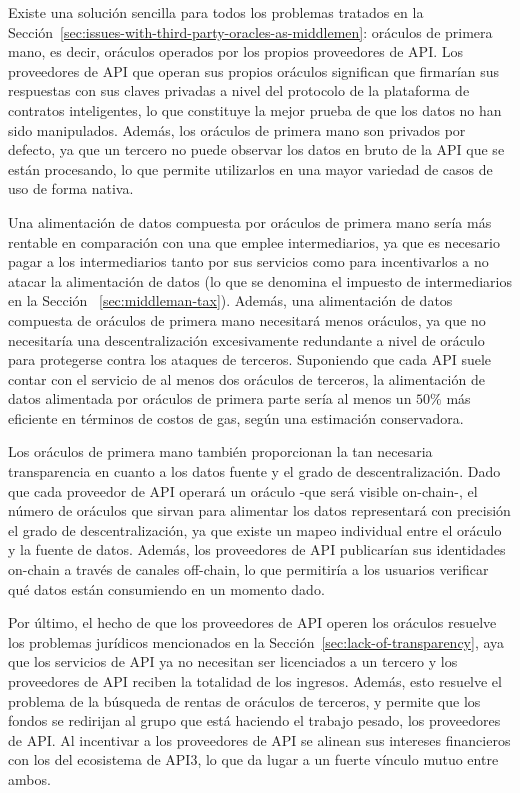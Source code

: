 \documentclass[11pt]{article}
\begin{document}
Existe una solución sencilla para todos los problemas tratados en la Sección~\ref{sec:issues-with-third-party-oracles-as-middlemen}: oráculos de primera mano, es decir, oráculos operados por los propios proveedores de API. Los proveedores de API que operan sus propios oráculos significan que firmarían sus respuestas con sus claves privadas a nivel del protocolo de la plataforma de contratos inteligentes, lo que constituye la mejor prueba de que los datos no han sido manipulados. Además, los oráculos de primera mano son privados por defecto, ya que un tercero no puede observar los datos en bruto de la API que se están procesando, lo que permite utilizarlos en una mayor variedad de casos de uso de forma nativa. 

Una alimentación de datos compuesta por oráculos de primera mano sería más rentable en comparación con una que emplee intermediarios, ya que es necesario pagar a los intermediarios tanto por sus servicios como para incentivarlos a no atacar la alimentación de datos (lo que se denomina el impuesto de intermediarios en la Sección ~\ref{sec:middleman-tax}).
Además, una alimentación de datos compuesta de oráculos de primera mano necesitará menos oráculos, ya que no necesitaría una descentralización excesivamente redundante a nivel de oráculo para protegerse contra los ataques de terceros. Suponiendo que cada API suele contar con el servicio de al menos dos oráculos de terceros, la alimentación de datos alimentada por oráculos de primera parte sería al menos un $50\%$ más eficiente en términos de costos de gas, según una estimación conservadora.


Los oráculos de primera mano también proporcionan la tan necesaria transparencia en cuanto a los datos fuente y el grado de descentralización. Dado que cada proveedor de API operará un oráculo -que será visible on-chain-, el número de oráculos que sirvan para alimentar los datos representará con precisión el grado de descentralización, ya que existe un mapeo individual entre el oráculo y la fuente de datos. Además, los proveedores de API publicarían sus identidades on-chain a través de canales off-chain, lo que permitiría a los usuarios verificar qué datos están consumiendo en un momento dado.

Por último, el hecho de que los proveedores de API operen los oráculos resuelve los problemas jurídicos mencionados en la Sección~\ref{sec:lack-of-transparency}, aya que los servicios de API ya no necesitan ser licenciados a un tercero y los proveedores de API reciben la totalidad de los ingresos. Además, esto resuelve el problema de la búsqueda de rentas de oráculos de terceros, y permite que los fondos se redirijan al grupo que está haciendo el trabajo pesado, los proveedores de API. Al incentivar a los proveedores de API se alinean sus intereses financieros con los del ecosistema de API3, lo que da lugar a un fuerte vínculo mutuo entre ambos.
\end{document}
